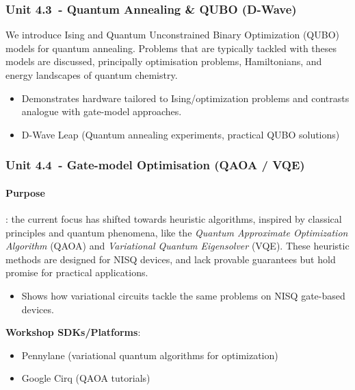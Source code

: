 \subsubsection*{Unit 4.3 - Quantum Annealing \& QUBO (D-Wave)}

We introduce Ising and Quantum Unconstrained Binary Optimization (QUBO) models for quantum annealing.  
Problems that are typically tackled with theses models are discussed, 
principally optimisation problems, Hamiltonians, and energy landscapes of quantum chemistry.

\begin{itemize}
	\item Demonstrates hardware tailored to Ising/optimization problems and contrasts analogue with gate-model approaches.
 	\item D-Wave Leap (Quantum annealing experiments, practical QUBO solutions)
\end{itemize}

\subsubsection*{Unit 4.4 - Gate-model Optimisation (QAOA / VQE)}

\paragraph{Purpose}: the current focus has shifted towards heuristic algorithms, inspired by classical principles and quantum phenomena, 
like the \emph{Quantum Approximate Optimization Algorithm} (QAOA) and \emph{Variational Quantum Eigensolver} (VQE).
These heuristic methods are designed for NISQ devices, and lack provable guarantees but hold promise for practical applications.

\begin{itemize}
	\item Shows how variational circuits tackle the same problems on NISQ gate-based devices.
\end{itemize}

\textbf{Workshop SDKs/Platforms}:
\begin{itemize}
	\item Pennylane (variational quantum algorithms for optimization)
	\item Google Cirq (QAOA tutorials)
\end{itemize}

